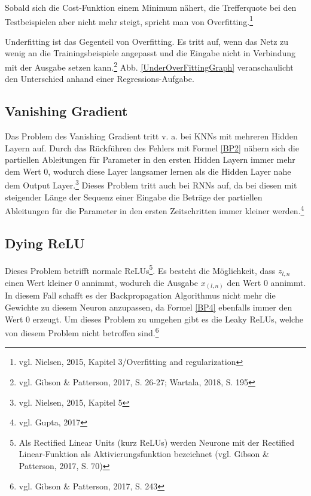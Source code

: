 \documentclass[a4paper,12pt,ngerman,oneside]{scrreprt}	%
\newcommand{\practitioner}[1]{vgl. Gibson \& Patterson, 2017, S. {#1}}
\begin{document}
			Sobald sich die Cost-Funktion einem Minimum nähert, die Trefferquote bei den Testbeispielen aber nicht mehr steigt, spricht man von Overfitting.\footnote{vgl. Nielsen, 2015, Kapitel 3/Overfitting and regularization}
			
			Underfitting ist das Gegenteil von Overfitting. Es tritt auf, wenn das Netz zu wenig an die Trainingsbeispiele angepasst und die Eingabe nicht in Verbindung mit der Ausgabe setzen kann.\footnote{\practitioner{26-27; Wartala, 2018, S. 195}} Abb. \ref{UnderOverFittingGraph} veranschaulicht den Unterschied anhand einer Regressions-Aufgabe. 
			
			\subsection{Vanishing Gradient}\label{VanishingGradient}
			Das Problem des Vanishing Gradient tritt v. a. bei KNNs mit mehreren Hidden Layern auf. Durch das Rückführen des Fehlers mit Formel \ref{BP2} nähern sich die partiellen Ableitungen für Parameter in den ersten Hidden Layern immer mehr dem Wert 0, wodurch diese Layer langsamer lernen als die Hidden Layer nahe dem Output Layer.\footnote{vgl. Nielsen, 2015, Kapitel 5} Dieses Problem tritt auch bei RNNs auf, da bei diesen mit steigender Länge der Sequenz einer Eingabe die Beträge der partiellen Ableitungen für die Parameter in den ersten Zeitschritten immer kleiner werden.\footnote{vgl. Gupta, 2017}
			
			\subsection{Dying ReLU}\label{DyingReLU}
			Dieses Problem betrifft normale ReLUs\footnote{Als Rectified Linear Units (kurz ReLUs) werden Neurone mit der Rectified Linear-Funktion als Aktivierungsfunktion bezeichnet (\practitioner{70})}. Es besteht die Möglichkeit, dass $z_{l,n}$ einen Wert kleiner 0 annimmt, wodurch die Ausgabe $x_{(l,n)}$ den Wert 0 annimmt. In diesem Fall schafft es der Backpropagation Algorithmus nicht mehr die Gewichte zu diesem Neuron anzupassen, da Formel \ref{BP4} ebenfalls immer den Wert 0 erzeugt. Um dieses Problem zu umgehen gibt es die Leaky ReLUs, welche von diesem Problem nicht betroffen sind.\footnote{\practitioner{243}}
			
\end{document}
